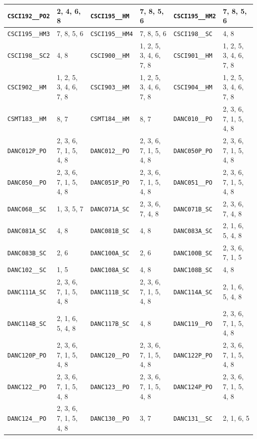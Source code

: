 \begin{longtable}{|l|l||l|l||l|l|}
    \verb|CSCI192__PO2| & 2, 4, 6, 8 & \verb|CSCI195__HM| & 7, 8, 5, 6 & \verb|CSCI195__HM2| & 7, 8, 5, 6\\\hline
    \verb|CSCI195__HM3| & 7, 8, 5, 6 & \verb|CSCI195__HM4| & 7, 8, 5, 6 & \verb|CSCI198__SC| & 4, 8\\\hline
    \verb|CSCI198__SC2| & 4, 8 & \verb|CSCI900__HM| & 1, 2, 5, 3, 4, 6, 7, 8 & \verb|CSCI901__HM| & 1, 2, 5, 3, 4, 6, 7, 8\\\hline
    \verb|CSCI902__HM| & 1, 2, 5, 3, 4, 6, 7, 8 & \verb|CSCI903__HM| & 1, 2, 5, 3, 4, 6, 7, 8 & \verb|CSCI904__HM| & 1, 2, 5, 3, 4, 6, 7, 8\\\hline
    \verb|CSMT183__HM| & 8, 7 & \verb|CSMT184__HM| & 8, 7 & \verb|DANC010__PO| & 2, 3, 6, 7, 1, 5, 4, 8\\\hline
    \verb|DANC012P_PO| & 2, 3, 6, 7, 1, 5, 4, 8 & \verb|DANC012__PO| & 2, 3, 6, 7, 1, 5, 4, 8 & \verb|DANC050P_PO| & 2, 3, 6, 7, 1, 5, 4, 8\\\hline
    \verb|DANC050__PO| & 2, 3, 6, 7, 1, 5, 4, 8 & \verb|DANC051P_PO| & 2, 3, 6, 7, 1, 5, 4, 8 & \verb|DANC051__PO| & 2, 3, 6, 7, 1, 5, 4, 8\\\hline
    \verb|DANC068__SC| & 1, 3, 5, 7 & \verb|DANC071A_SC| & 2, 3, 6, 7, 4, 8 & \verb|DANC071B_SC| & 2, 3, 6, 7, 4, 8\\\hline
    \verb|DANC081A_SC| & 4, 8 & \verb|DANC081B_SC| & 4, 8 & \verb|DANC083A_SC| & 2, 1, 6, 5, 4, 8\\\hline
    \verb|DANC083B_SC| & 2, 6 & \verb|DANC100A_SC| & 2, 6 & \verb|DANC100B_SC| & 2, 3, 6, 7, 1, 5\\\hline
    \verb|DANC102__SC| & 1, 5 & \verb|DANC108A_SC| & 4, 8 & \verb|DANC108B_SC| & 4, 8\\\hline
    \verb|DANC111A_SC| & 2, 3, 6, 7, 1, 5, 4, 8 & \verb|DANC111B_SC| & 2, 3, 6, 7, 1, 5, 4, 8 & \verb|DANC114A_SC| & 2, 1, 6, 5, 4, 8\\\hline
    \verb|DANC114B_SC| & 2, 1, 6, 5, 4, 8 & \verb|DANC117B_SC| & 4, 8 & \verb|DANC119__PO| & 2, 3, 6, 7, 1, 5, 4, 8\\\hline
    \verb|DANC120P_PO| & 2, 3, 6, 7, 1, 5, 4, 8 & \verb|DANC120__PO| & 2, 3, 6, 7, 1, 5, 4, 8 & \verb|DANC122P_PO| & 2, 3, 6, 7, 1, 5, 4, 8\\\hline
    \verb|DANC122__PO| & 2, 3, 6, 7, 1, 5, 4, 8 & \verb|DANC123__PO| & 2, 3, 6, 7, 1, 5, 4, 8 & \verb|DANC124P_PO| & 2, 3, 6, 7, 1, 5, 4, 8\\\hline
    \verb|DANC124__PO| & 2, 3, 6, 7, 1, 5, 4, 8 & \verb|DANC130__PO| & 3, 7 & \verb|DANC131__SC| & 2, 1, 6, 5\\\hline

\end{longtable}
